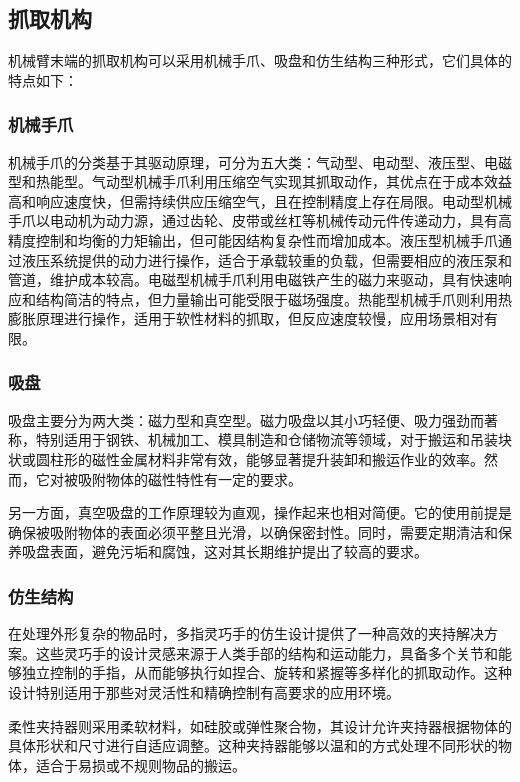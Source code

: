 \documentclass{report}
\begin{document}
\subsection{抓取机构}
\label{subsec:label}
机械臂末端的抓取机构可以采用机械手爪、吸盘和仿生结构三种形式，它们具体的特点如下：
\subsubsection{机械手爪}
\label{subsec:label}
机械手爪的分类基于其驱动原理，可分为五大类：气动型、电动型、液压型、电磁型和热能型。气动型机械手爪利用压缩空气实现其抓取动作，其优点在于成本效益高和响应速度快，但需持续供应压缩空气，且在控制精度上存在局限。电动型机械手爪以电动机为动力源，通过齿轮、皮带或丝杠等机械传动元件传递动力，具有高精度控制和均衡的力矩输出，但可能因结构复杂性而增加成本。液压型机械手爪通过液压系统提供的动力进行操作，适合于承载较重的负载，但需要相应的液压泵和管道，维护成本较高。电磁型机械手爪利用电磁铁产生的磁力来驱动，具有快速响应和结构简洁的特点，但力量输出可能受限于磁场强度。热能型机械手爪则利用热膨胀原理进行操作，适用于软性材料的抓取，但反应速度较慢，应用场景相对有限。

\newpage
\subsubsection{吸盘}
\label{subsec:label}
吸盘主要分为两大类：磁力型和真空型。磁力吸盘以其小巧轻便、吸力强劲而著称，特别适用于钢铁、机械加工、模具制造和仓储物流等领域，对于搬运和吊装块状或圆柱形的磁性金属材料非常有效，能够显著提升装卸和搬运作业的效率。然而，它对被吸附物体的磁性特性有一定的要求。

另一方面，真空吸盘的工作原理较为直观，操作起来也相对简便。它的使用前提是确保被吸附物体的表面必须平整且光滑，以确保密封性。同时，需要定期清洁和保养吸盘表面，避免污垢和腐蚀，这对其长期维护提出了较高的要求。
\subsubsection{仿生结构}
\label{subsec:label}
在处理外形复杂的物品时，多指灵巧手的仿生设计提供了一种高效的夹持解决方案。这些灵巧手的设计灵感来源于人类手部的结构和运动能力，具备多个关节和能够独立控制的手指，从而能够执行如捏合、旋转和紧握等多样化的抓取动作。这种设计特别适用于那些对灵活性和精确控制有高要求的应用环境。

柔性夹持器则采用柔软材料，如硅胶或弹性聚合物，其设计允许夹持器根据物体的具体形状和尺寸进行自适应调整。这种夹持器能够以温和的方式处理不同形状的物体，适合于易损或不规则物品的搬运。
\end{document}
